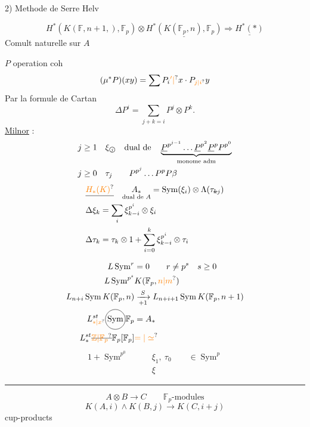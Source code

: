 2) Methode de Serre \quad {} Helv 

\[
H^{*}(K(\mathbb F,n+1,),\mathbb F_p)\otimes
\underline{H^{*}(K(\mathbb F_p,n),\mathbb F_p)}\Longrightarrow\underline{H^{*}(*)}
\]
Comult naturelle sur $A$

$P$ operation coh
\[
(\mu^{*}P)(xy)=\sum P_i\unsure{{}'|{}}x\cdot P_{\unsure{j|i}}y
\]
Par la formule de Cartan
\[
\Delta P^i=\sum_{j+k=i}P^j\otimes P^k .
\]
\uline{Milnor} :
\[
\begin{aligned}
j\geq1\quad&\xi_{\text{\textcircled{$\scriptstyle j$}}}\quad\text{dual de}\quad
\underbrace{\underline P^{p^{j-1}}\ldots\underline P^{p^2}\underline P^{p}P^{p^0}}_{\text{monome adm}}\\
j\geq0\quad&\tau_j\qquad P^{p^j}\ldots P^p P\beta
\end{aligned}
\]
\[
\begin{aligned}
&\deleted{\unsure{H_{*}(K)}}\quad\underset{\text{dual de $A$}}{A_{*}}
=\operatorname{Sym}(\xi_i)\otimes\Lambda(\tau_{\deleted{k}j})\\
&\Delta\xi_k=\sum_i\xi_{k-i}^{p^i}\otimes\xi_i\\
&\Delta\tau_k=\tau_k\otimes1+\sum_{i=0}^{k}\xi_{k-i}^{p^i}\otimes\tau_i
\end{aligned}
\]

\[
\begin{aligned}
L\operatorname{Sym}^{r}&=0\qquad r\ne p^s\quad s\geq0\\
L\operatorname{Sym}^{p^s}&K(\mathbb F_p,\unsure{n|m})\\
L_{n+i}\operatorname{Sym} K(\mathbb F_p,n)&
\xrightarrow[+1]{S}L_{n+i+1}\operatorname{Sym}K(\mathbb F_p,n+1)\\
L_{\unsure{*|x}}^{st}\tikz[baseline=(s.base)]{\node[draw,circle,inner sep=1pt](s){$\operatorname{Sym}$};}\mathbb F_p&=A_{*}\\
L_{*}^{st}\deleted{\unsure{\mathbb Z|\mathbb F_p}}\mathbb F_p[\mathbb F_p]&\unsure{=|\simeq}
\end{aligned}
\]
\[
\begin{aligned}
1+\operatorname{Sym}^{p^0}\qquad&\xi_1,\ \tau_0\qquad\in\operatorname{Sym}^{p}\\
&\xi
\end{aligned}
\]

\begin{center}\rule{.8\linewidth}{0.3pt}\end{center}
\[
A\otimes B\longrightarrow C\qquad \mathbb F_p\text{-modules}
\]
\[
K(A,i)\wedge K(B,j)\longrightarrow K(C,i+j)
\]
cup-products 

